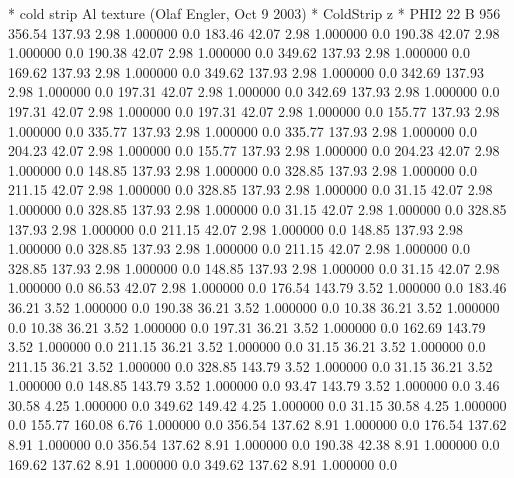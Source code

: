 * cold strip Al texture (Olaf Engler, Oct 9 2003)
* ColdStrip z
* PHI2 22
B   956
  356.54  137.93    2.98    1.000000    0.0
  183.46   42.07    2.98    1.000000    0.0
  190.38   42.07    2.98    1.000000    0.0
  190.38   42.07    2.98    1.000000    0.0
  349.62  137.93    2.98    1.000000    0.0
  169.62  137.93    2.98    1.000000    0.0
  349.62  137.93    2.98    1.000000    0.0
  342.69  137.93    2.98    1.000000    0.0
  197.31   42.07    2.98    1.000000    0.0
  342.69  137.93    2.98    1.000000    0.0
  197.31   42.07    2.98    1.000000    0.0
  197.31   42.07    2.98    1.000000    0.0
  155.77  137.93    2.98    1.000000    0.0
  335.77  137.93    2.98    1.000000    0.0
  335.77  137.93    2.98    1.000000    0.0
  204.23   42.07    2.98    1.000000    0.0
  155.77  137.93    2.98    1.000000    0.0
  204.23   42.07    2.98    1.000000    0.0
  148.85  137.93    2.98    1.000000    0.0
  328.85  137.93    2.98    1.000000    0.0
  211.15   42.07    2.98    1.000000    0.0
  328.85  137.93    2.98    1.000000    0.0
   31.15   42.07    2.98    1.000000    0.0
  328.85  137.93    2.98    1.000000    0.0
   31.15   42.07    2.98    1.000000    0.0
  328.85  137.93    2.98    1.000000    0.0
  211.15   42.07    2.98    1.000000    0.0
  148.85  137.93    2.98    1.000000    0.0
  328.85  137.93    2.98    1.000000    0.0
  211.15   42.07    2.98    1.000000    0.0
  328.85  137.93    2.98    1.000000    0.0
  148.85  137.93    2.98    1.000000    0.0
   31.15   42.07    2.98    1.000000    0.0
   86.53   42.07    2.98    1.000000    0.0
  176.54  143.79    3.52    1.000000    0.0
  183.46   36.21    3.52    1.000000    0.0
  190.38   36.21    3.52    1.000000    0.0
   10.38   36.21    3.52    1.000000    0.0
   10.38   36.21    3.52    1.000000    0.0
  197.31   36.21    3.52    1.000000    0.0
  162.69  143.79    3.52    1.000000    0.0
  211.15   36.21    3.52    1.000000    0.0
   31.15   36.21    3.52    1.000000    0.0
  211.15   36.21    3.52    1.000000    0.0
  328.85  143.79    3.52    1.000000    0.0
   31.15   36.21    3.52    1.000000    0.0
  148.85  143.79    3.52    1.000000    0.0
   93.47  143.79    3.52    1.000000    0.0
    3.46   30.58    4.25    1.000000    0.0
  349.62  149.42    4.25    1.000000    0.0
   31.15   30.58    4.25    1.000000    0.0
  155.77  160.08    6.76    1.000000    0.0
  356.54  137.62    8.91    1.000000    0.0
  176.54  137.62    8.91    1.000000    0.0
  356.54  137.62    8.91    1.000000    0.0
  190.38   42.38    8.91    1.000000    0.0
  169.62  137.62    8.91    1.000000    0.0
  349.62  137.62    8.91    1.000000    0.0
